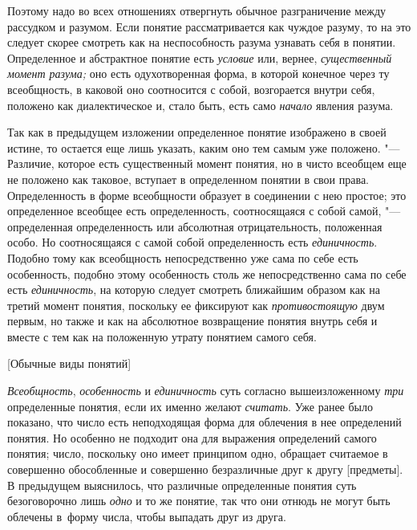 Поэтому надо во всех отношениях отвергнуть обычное
разграничение между рассудком и разумом. Если понятие рассматривается как
чуждое разуму, то на это следует скорее смотреть как на неспособность
разума узнавать себя в понятии. Определенное и абстрактное понятие есть
{\em условие} или, вернее, {\em существенный момент
разума;} оно есть одухотворенная форма, в которой конечное
через ту всеобщность, в каковой оно соотносится с собой, возгорается внутри
себя, положено как диалектическое и, стало быть, есть само
{\em начало} явления разума.

Так как в предыдущем изложении определенное понятие изображено
в своей истине, то остается еще лишь указать, каким оно тем самым уже
положено. "--- Различие, которое есть существенный момент
понятия, но в чисто всеобщем еще не положено как таковое, вступает в
определенном понятии в свои права. Определенность в форме всеобщности
образует в соединении с нею простое; это определенное
всеобщее есть определенность, соотносящаяся с собой самой, "---
определенная определенность или абсолютная отрицательность,
положенная особо. Но соотносящаяся с самой собой определенность есть
{\em единичность}.
Подобно тому как всеобщность непосредственно уже сама по себе
есть особенность, подобно этому особенность столь же непосредственно сама
по себе есть {\em единичность},
на которую следует смотреть ближайшим образом как на третий
момент понятия, поскольку ее фиксируют как {\em противостоящую} двум
первым, но также и как на абсолютное возвращение понятия внутрь себя и
вместе с тем как на положенную утрату понятием самого себя.

%
  {[Обычные виды понятий]}

{\em Всеобщность}, {\em особенность} и {\em единичность} суть
согласно вышеизложенному {\em три}
определенные понятия, если их именно желают {\em считать}. Уже ранее
было показано, что число есть неподходящая форма для облечения в нее
определений понятия.
Но особенно не подходит она для выражения определений самого
понятия; число, поскольку оно имеет принципом одно, обращает считаемое в
совершенно обособленные и совершенно безразличные друг к другу [предметы].
В предыдущем выяснилось, что различные определенные понятия суть безоговорочно
лишь {\em одно} и то же понятие, так что они отнюдь не могут быть облечены
в~форму числа, чтобы выпадать друг из друга.

